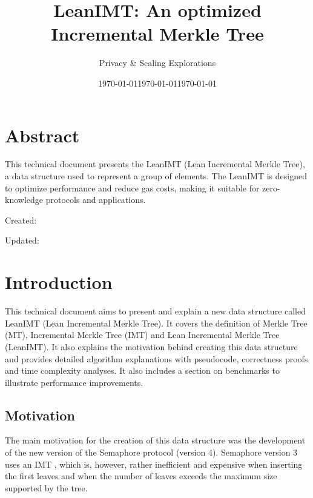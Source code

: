 \documentclass{article}
\title{LeanIMT: An optimized Incremental Merkle Tree}
\author{Privacy \& Scaling Explorations}
\date{\today}
\begin{document}
\maketitle

\section*{Abstract}

This technical document presents the LeanIMT (Lean Incremental Merkle Tree), a data structure used to represent a group of elements. The LeanIMT is designed to optimize performance and reduce gas costs, making it suitable for zero-knowledge \cite{zero_knowledge_definition} protocols and applications.

\newpage
Created: \date{\today}

Updated: \date{\today}

\newpage
\tableofcontents
\newpage

\section{Introduction}

This technical document aims to present and explain a new data structure called LeanIMT (Lean Incremental Merkle Tree). It covers the definition of Merkle Tree (MT), Incremental Merkle Tree (IMT) and Lean Incremental Merkle Tree (LeanIMT). It also explains the motivation behind creating this data structure and provides detailed algorithm explanations with pseudocode, correctness proofs and time complexity analyses. It also includes a section on benchmarks to illustrate performance improvements.

\subsection{Motivation}

The main motivation for the creation of this data structure was the development of the new version of the Semaphore protocol \cite{semaphore_v1_whitepaper} \cite{semaphore_website} (version 4). Semaphore version 3 uses an IMT \cite{imt_typescript} \cite{imt_solidity}, which is, however, rather inefficient and expensive when inserting the first leaves and when the number of leaves exceeds the maximum size supported by the tree.
\end{document}
